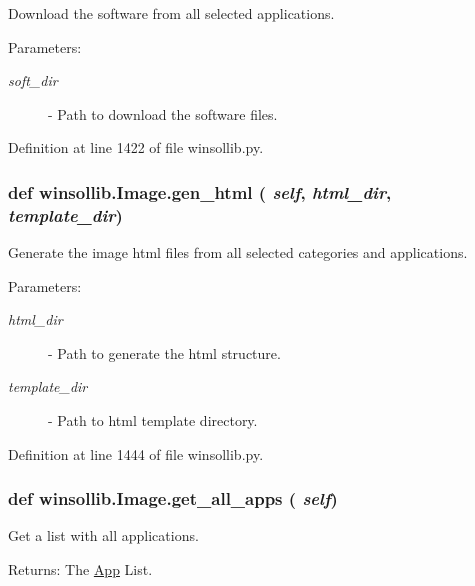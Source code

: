 Download the software from all selected applications. 

\begin{Desc}
\item[Parameters:]
\begin{description}
\item[{\em soft\_\-dir}]- Path to download the software files. \end{description}
\end{Desc}


Definition at line 1422 of file winsollib.py.\hypertarget{classwinsollib_1_1Image_8540f035639495266049a6a31a6075eb}{
\subsubsection[gen\_\-html]{\setlength{\rightskip}{0pt plus 5cm}def winsollib.Image.gen\_\-html ( {\em self},  {\em html\_\-dir},  {\em template\_\-dir})}}
\label{classwinsollib_1_1Image_8540f035639495266049a6a31a6075eb}


Generate the image html files from all selected categories and applications. 

\begin{Desc}
\item[Parameters:]
\begin{description}
\item[{\em html\_\-dir}]- Path to generate the html structure. \item[{\em template\_\-dir}]- Path to html template directory. \end{description}
\end{Desc}


Definition at line 1444 of file winsollib.py.\hypertarget{classwinsollib_1_1Image_843aed24a4897540551ddea5635b8717}{
\subsubsection[get\_\-all\_\-apps]{\setlength{\rightskip}{0pt plus 5cm}def winsollib.Image.get\_\-all\_\-apps ( {\em self})}}
\label{classwinsollib_1_1Image_843aed24a4897540551ddea5635b8717}


Get a list with all applications. 

\begin{Desc}
\item[Returns:]The \hyperlink{classwinsollib_1_1App}{App} List. \end{Desc}


